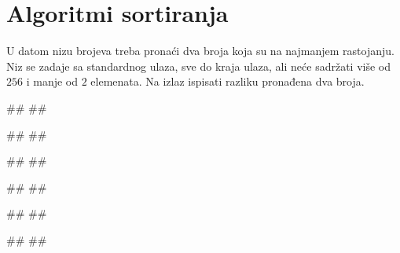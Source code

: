 \section{Algoritmi sortiranja}

\begin{Exercise}[label=501]
  U datom nizu brojeva treba pronaći dva broja koja su na najmanjem
  rastojanju. Niz se zadaje sa standardnog ulaza, sve do kraja ulaza,
  ali neće sadržati više od $256$ i manje od $2$ elemenata. Na izlaz
  ispisati razliku pronađena dva broja. 

\begin{minitest}
\begin{test}{1}
#\naslovUlaz#
##

#\naslovIzlaz#
##
\end{test}
\end{minitest}
\begin{minitest}
\begin{test}{2}
#\naslovUlaz#
##
  
#\naslovIzlaz#
##
\end{test}
\end{minitest}
\begin{minitest}
\begin{test}{3}
#\naslovUlaz#
##

#\naslovIzlaz#
##
\end{test}
\end{minitest}
  
\end{Exercise}

